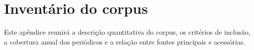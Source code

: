 \chapter{Inventário do corpus}

Este apêndice reunirá a descrição quantitativa do corpus, os critérios de inclusão, a cobertura anual dos periódicos e a relação entre fontes principais e acessórias.


